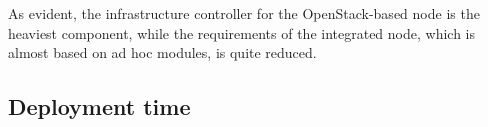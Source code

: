As evident, the infrastructure controller for the OpenStack-based node is the heaviest component, while the requirements of the integrated node, which is almost based on ad hoc modules, is quite reduced.




\subsection{Deployment time}


